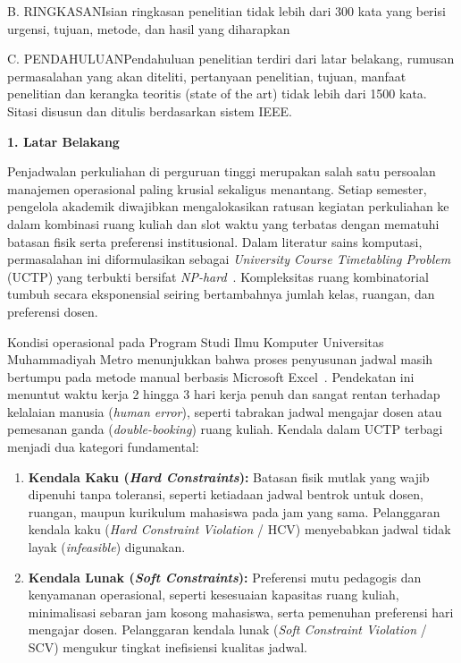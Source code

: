 \documentclass[letterpaper,12pt,oneside]{article}
\newcommand{\subheading}[2]{%
  \par\vspace{0.8em}\noindent
  \textbf{#1. #2}\par\vspace{0.3em}
}
\begin{document}
\begin{wordsection}{B. RINGKASAN}{Isian ringkasan penelitian tidak lebih dari 300 kata yang berisi urgensi, tujuan, metode, dan hasil yang diharapkan}
\end{wordsection}%
\vspace{-1.2pt}%
\noindent\begin{wordsection}{C. PENDAHULUAN}{Pendahuluan penelitian terdiri dari latar belakang, rumusan permasalahan yang akan diteliti, pertanyaan penelitian, tujuan, manfaat penelitian dan kerangka teoritis (state of the art) tidak lebih dari 1500 kata. Sitasi disusun dan ditulis berdasarkan sistem IEEE.}

\subheading{1}{Latar Belakang}

Penjadwalan perkuliahan di perguruan tinggi merupakan salah satu persoalan manajemen operasional paling krusial sekaligus menantang. Setiap semester, pengelola akademik diwajibkan mengalokasikan ratusan kegiatan perkuliahan ke dalam kombinasi ruang kuliah dan slot waktu yang terbatas dengan mematuhi batasan fisik serta preferensi institusional. Dalam literatur sains komputasi, permasalahan ini diformulasikan sebagai \textit{University Course Timetabling Problem} (UCTP) yang terbukti bersifat \textit{NP-hard}~\cite{qu2009survey,mccollum2009setting}. Kompleksitas ruang kombinatorial tumbuh secara eksponensial seiring bertambahnya jumlah kelas, ruangan, dan preferensi dosen.

Kondisi operasional pada Program Studi Ilmu Komputer Universitas Muhammadiyah Metro menunjukkan bahwa proses penyusunan jadwal masih bertumpu pada metode manual berbasis Microsoft Excel~\cite{mustika2025penerapan}. Pendekatan ini menuntut waktu kerja 2 hingga 3 hari kerja penuh dan sangat rentan terhadap kelalaian manusia (\textit{human error}), seperti tabrakan jadwal mengajar dosen atau pemesanan ganda (\textit{double-booking}) ruang kuliah. Kendala dalam UCTP terbagi menjadi dua kategori fundamental:
\begin{enumerate}
    \item \textbf{Kendala Kaku (\textit{Hard Constraints}):} Batasan fisik mutlak yang wajib dipenuhi tanpa toleransi, seperti ketiadaan jadwal bentrok untuk dosen, ruangan, maupun kurikulum mahasiswa pada jam yang sama. Pelanggaran kendala kaku (\textit{Hard Constraint Violation} / HCV) menyebabkan jadwal tidak layak (\textit{infeasible}) digunakan.
    \item \textbf{Kendala Lunak (\textit{Soft Constraints}):} Preferensi mutu pedagogis dan kenyamanan operasional, seperti kesesuaian kapasitas ruang kuliah, minimalisasi sebaran jam kosong mahasiswa, serta pemenuhan preferensi hari mengajar dosen. Pelanggaran kendala lunak (\textit{Soft Constraint Violation} / SCV) mengukur tingkat inefisiensi kualitas jadwal.
\end{enumerate}


\end{wordsection}
\end{document}
